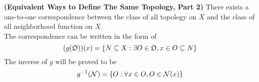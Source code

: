 \documentclass{report}
\begin{document}
\begin{theorem}
\label{0.1.5}
\textbf{(Equivalent Ways to Define The Same Topology, Part 2)} There exists a one-to-one correspondence between the class of all topology on $X$ and the class of all neighborhood function on $X$.\\

The correspondence can be written in the form of 
\begin{equation} (g(\mathfrak{O}))(x)=\{ N\subseteq X: \exists O\in \mathfrak{O},x\in O\subseteq N \}
\end{equation}
The inverse of $g$ will be proved to be
 \begin{equation}
g^{-1}(\mathcal{N})=\{ O:\forall x \in O, O\in \mathcal{N}(x) \}
\end{equation}
\end{theorem}
\end{document}
